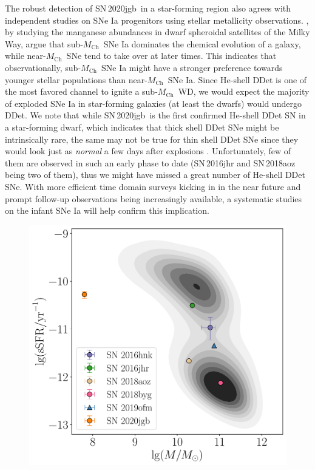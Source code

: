 \documentclass[twocolumn]{aastex631}
\newcommand{\sn}{SN\,2020jgb}
\newcommand{\Mch}{$M_\mathrm{Ch}$}
\begin{document}
{The robust detection of \sn\ in a star-forming region also agrees with independent studies on SNe Ia progenitors using stellar metallicity observations. \citet{de_los_reyes_manganese_2020}, by studying the manganese abundances in dwarf spheroidal satellites of the Milky Way, argue that sub-\Mch\ SNe Ia dominates the chemical evolution of a galaxy, while near-\Mch\ SNe tend to take over at later times. This indicates that observationally, sub-\Mch\ SNe Ia might have a stronger preference towards younger stellar populations than near-\Mch\ SNe Ia. Since He-shell DDet is one of the most favored channel to ignite a sub-\Mch\ WD, we would expect the majority of exploded SNe Ia in star-forming galaxies (at least the dwarfs) would undergo DDet. We note that while \sn\ is the first confirmed He-shell DDet SN in a star-forming dwarf, which indicates that thick shell DDet SNe might be intrinsically rare, the same may not be true for thin shell DDet SNe since they would look just as {\it normal} a few days after explosions \citep{Ni_2022}. Unfortunately, few of them are observed in such an early phase to date (SN\,2016jhr and SN\,2018aoz being two of them), thus we might have missed a great number of He-shell DDet SNe. With more efficient time domain surveys kicking in in the near future and prompt follow-up observations being increasingly available, a systematic studies on the infant SNe Ia will help confirm this implication.
\begin{figure}
    \centering
    \includegraphics[width=\linewidth]{host.pdf}

\end{figure}}
\end{document}
